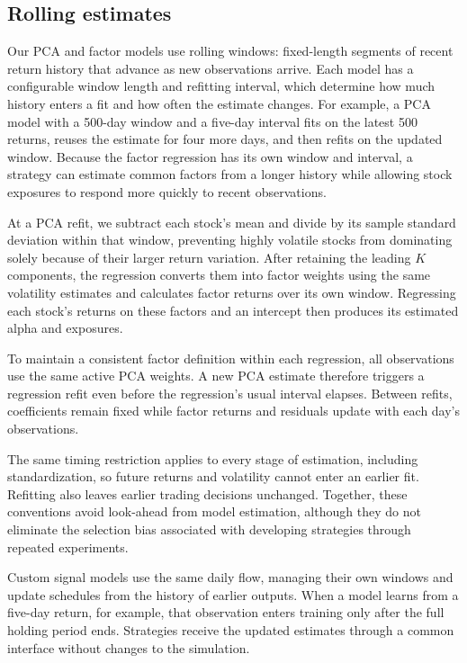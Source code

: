 \subsection{Rolling estimates}

Our PCA and factor models use rolling windows: fixed-length segments of
recent return history that advance as new observations arrive. Each model
has a configurable window length and refitting interval, which determine
how much history enters a fit and how often the estimate changes.
For example, a PCA model with a 500-day window and a five-day interval
fits on the latest 500 returns, reuses the estimate for four more days,
and then refits on the updated window. Because the factor regression has
its own window and interval, a strategy can estimate common factors from
a longer history while allowing stock exposures to respond more quickly
to recent observations.

At a PCA refit, we subtract each stock's mean and divide by its sample
standard deviation within that window, preventing highly volatile stocks
from dominating solely because of their larger return variation. After
retaining the leading \(K\) components, the regression converts them into
factor weights using the same volatility estimates and calculates factor
returns over its own window. Regressing each stock's returns on these
factors and an intercept then produces its estimated alpha and exposures.

To maintain a consistent factor definition within each regression, all
observations use the same active PCA weights. A new PCA estimate therefore
triggers a regression refit even before the regression's usual interval
elapses. Between refits, coefficients remain fixed while factor returns
and residuals update with each day's observations.

The same timing restriction applies to every stage of estimation,
including standardization, so future returns and volatility cannot enter
an earlier fit. Refitting also leaves earlier trading decisions unchanged.
Together, these conventions avoid look-ahead from model estimation,
although they do not eliminate the selection bias associated with
developing strategies through repeated experiments.

Custom signal models use the same daily flow, managing their own windows
and update schedules from the history of earlier outputs. When a model
learns from a five-day return, for example, that observation enters training
only after the full holding period ends. Strategies receive the updated
estimates through a common interface without changes to the simulation.

